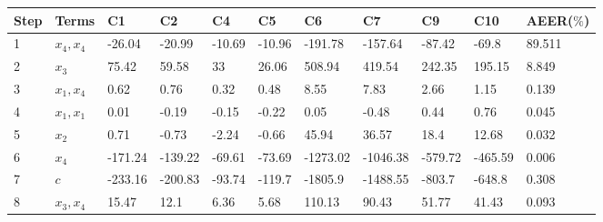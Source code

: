 \begin{tabular}{lllllllllll}
Step & Terms & C1 & C2 & C4 & C5 & C6 & C7 & C9 & C10 & AEER($\%$) \\ 
\hline 
1 & $x_4,x_4$ & -26.04 & -20.99 & -10.69 & -10.96 & -191.78 & -157.64 & -87.42 & -69.8 & 89.511 \\ 
2 & $x_3$ & 75.42 & 59.58 & 33 & 26.06 & 508.94 & 419.54 & 242.35 & 195.15 & 8.849 \\ 
3 & $x_1,x_4$ & 0.62 & 0.76 & 0.32 & 0.48 & 8.55 & 7.83 & 2.66 & 1.15 & 0.139 \\ 
4 & $x_1,x_1$ & 0.01 & -0.19 & -0.15 & -0.22 & 0.05 & -0.48 & 0.44 & 0.76 & 0.045 \\ 
5 & $x_2$ & 0.71 & -0.73 & -2.24 & -0.66 & 45.94 & 36.57 & 18.4 & 12.68 & 0.032 \\ 
6 & $x_4$ & -171.24 & -139.22 & -69.61 & -73.69 & -1273.02 & -1046.38 & -579.72 & -465.59 & 0.006 \\ 
7 & $c$ & -233.16 & -200.83 & -93.74 & -119.7 & -1805.9 & -1488.55 & -803.7 & -648.8 & 0.308 \\ 
8 & $x_3,x_4$ & 15.47 & 12.1 & 6.36 & 5.68 & 110.13 & 90.43 & 51.77 & 41.43 & 0.093 \\ 
\hline 
\end{tabular}